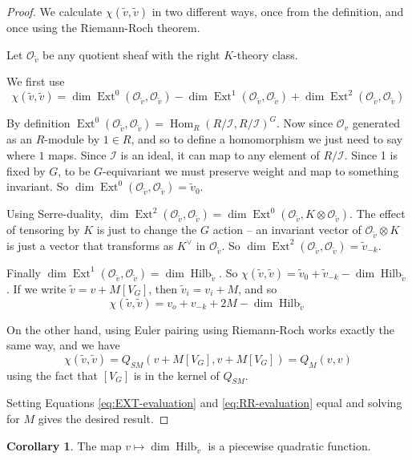 \documentclass{amsart}[12pt]
\theoremstyle{definition}
\newtheorem{corollary}[dummy]{Corollary}
\newcommand{\OO}{\mathcal{O}}
\newcommand{\II}{\mathcal{I}}
\DeclareMathOperator{\Hilb}{Hilb}
\DeclareMathOperator{\Ext}{Ext}
\DeclareMathOperator{\Hom}{Hom}
\begin{document}
\begin{proof}
We calculate $\chi(\tilde{v},\tilde{v})$ in two different ways, once from the definition, and once using the Riemann-Roch theorem.

Let $\OO_{\tilde{v}}$ be any quotient sheaf with the right $K$-theory class.  

We first use
$$\chi(\tilde{v}, \tilde{v})=\dim\Ext^0(\OO_{\tilde{v}},\OO_{\tilde{v}})-\dim\Ext^1(\OO_{\tilde{v}},\OO_{\tilde{v}})+\dim\Ext^2(\OO_{\tilde{v}},\OO_{\tilde{v}})$$

By definition $\Ext^0(\OO_{\tilde{v}},\OO_{\tilde{v}})=\Hom_R(R/\II,R/\II)^G$.  Now since $\OO_v$ generated as an $R$-module by $1\in R$, and so to define a homomorphism we just need to say where $1$ maps. Since $\II$ is an ideal, it can map to any element of $R/\II$.  Since 1 is fixed by $G$, to be $G$-equivariant we must preserve weight and map to something invariant.  So $\dim\Ext^0(\OO_{\tilde{v}},\OO_{\tilde{v}})=\tilde{v}_0$.  

Using Serre-duality, $\dim\Ext^2(\OO_{\tilde{v}},\OO_{\tilde{v}})=\dim\Ext^0(\OO_{\tilde{v}},K\otimes\OO_{\tilde{v}})$.  The effect of tensoring by $K$ is just to change the $G$ action -- an invariant vector of $\OO_{\tilde{v}}\otimes K$ is just a vector that transforms as $K^\vee$ in $\OO_{\tilde{v}}$.  
So $\dim\Ext^2(\OO_{\tilde{v}},\OO_{\tilde{v}})=\tilde{v}_{-k}$.  

Finally $\dim\Ext^1(\OO_{\tilde{v}},\OO_{\tilde{v}})=\dim\Hilb_{\tilde{v}}$.  So $\chi(\tilde{v},\tilde{v})=\tilde{v}_0+\tilde{v}_{-k}-\dim\Hilb_{\tilde{v}}$.  If we write $\tilde{v}=v+M [V_G]$, then $\tilde{v}_i=v_i+M$, and so  
\begin{equation} \label{eq:EXT-evaluation}
\chi(\tilde{v},\tilde{v})=v_o+v_{-k}+2M-\dim\Hilb_{\tilde{v}} 
\end{equation}

On the other hand, using Euler pairing using Riemann-Roch works exactly the same way, and we have
\begin{equation} \label{eq:RR-evaluation}
\chi(\tilde{v},\tilde{v})=Q_{SM}(v+M[V_G],v+M[V_G])=Q_M(v,v)
\end{equation}
using the fact that $[V_G]$ is in the kernel of $Q_{SM}$.  

Setting Equations \ref{eq:EXT-evaluation} and \ref{eq:RR-evaluation} equal and solving for $M$ gives the desired result.

\end{proof}


\begin{corollary}
The map $v\mapsto \dim\Hilb_{\tilde{v}}$ is a piecewise quadratic function.
\end{corollary}
\end{document}

